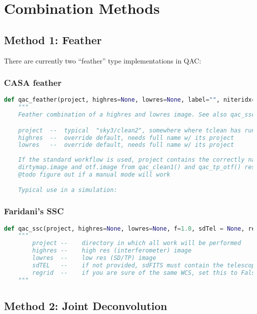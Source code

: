 \documentclass[12pt,a4paper]{article}
\begin{document}
\section{Combination Methods}

\subsection{Method 1: Feather}

There are currently two ``feather'' type implementations in QAC:

\subsubsection{CASA feather}

\begin{lstlisting}[language=Python]
def qac_feather(project, highres=None, lowres=None, label="", niteridx=0, name="dirtymap"):
    """
    Feather combination of a highres and lowres image. See also qac_ssc()

    project  --  typical  "sky3/clean2", somewhere where tclean has run
    highres  --  override default, needs full name w/ its project
    lowres   --  override default, needs full name w/ its project
    
    If the standard workflow is used, project contains the correctly named
    dirtymap.image and otf.image from qac_clean1() and qac_tp_otf() resp.
    @todo figure out if a manual mode will work

    Typical use in a simulation:
\end{lstlisting}

\subsubsection{Faridani's SSC}

\begin{lstlisting}[language=Python]
def qac_ssc(project, highres=None, lowres=None, f=1.0, sdTel = None, regrid=True, cleanup=True, label="", niteridx=0, name="dirtymap"):
    """
        project --    directory in which all work will be performed
        highres --    high res (interferometer) image
        lowres  --    low res (SD/TP) image
        sdTEL   --    if not provided, sdFITS must contain the telescope
        regrid  --    if you are sure of the same WCS, set this to False
    """
\end{lstlisting}

\subsection{Method 2: Joint Deconvolution}
\end{document}
